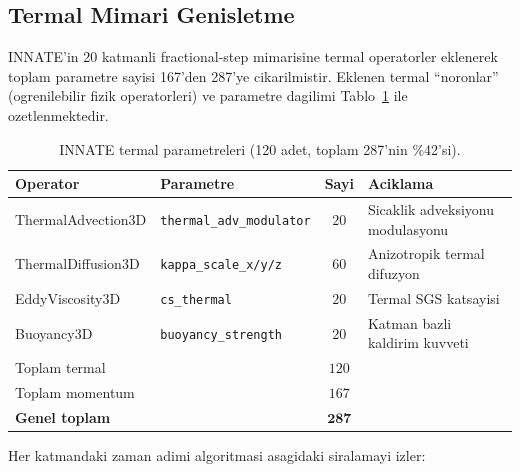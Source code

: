 \subsection{Termal Mimari Genisletme}
\label{sec:thermal-architecture}

INNATE'in 20 katmanli fractional-step mimarisine termal operatorler eklenerek
toplam parametre sayisi 167'den 287'ye cikarilmistir. Eklenen termal
``noronlar'' (ogrenilebilir fizik operatorleri) ve parametre dagilimi
Tablo~\ref{tab:thermal-params} ile ozetlenmektedir.

\begin{table}[H]
  \centering
  \caption{INNATE termal parametreleri (120 adet, toplam 287'nin \%42'si).}
  \label{tab:thermal-params}
  \begin{tabular}{llcl}
    \toprule
    Operator & Parametre & Sayi & Aciklama \\
    \midrule
    ThermalAdvection3D & \texttt{thermal\_adv\_modulator} & $20$ & Sicaklik adveksiyonu modulasyonu \\
    ThermalDiffusion3D & \texttt{kappa\_scale\_x/y/z} & $60$ & Anizotropik termal difuzyon \\
    EddyViscosity3D & \texttt{cs\_thermal} & $20$ & Termal SGS katsayisi \\
    Buoyancy3D & \texttt{buoyancy\_strength} & $20$ & Katman bazli kaldirim kuvveti \\
    \midrule
    \multicolumn{2}{l}{Toplam termal} & $120$ & \\
    \multicolumn{2}{l}{Toplam momentum} & $167$ & \\
    \multicolumn{2}{l}{\textbf{Genel toplam}} & $\mathbf{287}$ & \\
    \bottomrule
  \end{tabular}
\end{table}

Her katmandaki zaman adimi algoritmasi asagidaki siralamayi izler:

